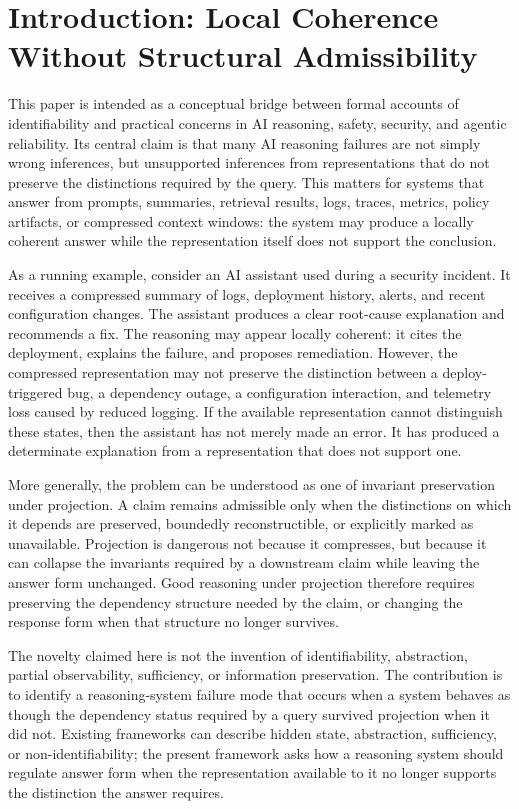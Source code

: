 \documentclass[11pt]{article}
\begin{document}
\section{Introduction: Local Coherence Without Structural Admissibility}

This paper is intended as a conceptual bridge between formal accounts of identifiability and practical concerns in AI reasoning, safety, security, and agentic reliability. Its central claim is that many AI reasoning failures are not simply wrong inferences, but unsupported inferences from representations that do not preserve the distinctions required by the query. This matters for systems that answer from prompts, summaries, retrieval results, logs, traces, metrics, policy artifacts, or compressed context windows: the system may produce a locally coherent answer while the representation itself does not support the conclusion.

As a running example, consider an AI assistant used during a security incident. It receives a compressed summary of logs, deployment history, alerts, and recent configuration changes. The assistant produces a clear root-cause explanation and recommends a fix. The reasoning may appear locally coherent: it cites the deployment, explains the failure, and proposes remediation. However, the compressed representation may not preserve the distinction between a deploy-triggered bug, a dependency outage, a configuration interaction, and telemetry loss caused by reduced logging. If the available representation cannot distinguish these states, then the assistant has not merely made an error. It has produced a determinate explanation from a representation that does not support one.

More generally, the problem can be understood as one of invariant preservation under projection. A claim remains admissible only when the distinctions on which it depends are preserved, boundedly reconstructible, or explicitly marked as unavailable. Projection is dangerous not because it compresses, but because it can collapse the invariants required by a downstream claim while leaving the answer form unchanged. Good reasoning under projection therefore requires preserving the dependency structure needed by the claim, or changing the response form when that structure no longer survives.

The novelty claimed here is not the invention of identifiability, abstraction, partial observability, sufficiency, or information preservation. The contribution is to identify a reasoning-system failure mode that occurs when a system behaves as though the dependency status required by a query survived projection when it did not. Existing frameworks can describe hidden state, abstraction, sufficiency, or non-identifiability; the present framework asks how a reasoning system should regulate answer form when the representation available to it no longer supports the distinction the answer requires.
\end{document}
